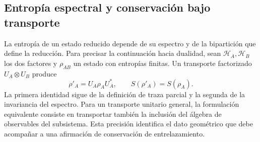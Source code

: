 \subsection{Entropía espectral y conservación bajo transporte}
\label{v:v:ant:sec:biparticion-transporte}

La entropía de un estado reducido depende de su espectro y de la
bipartición que define la reducción. Para precisar la continuación
hacia dualidad, sean \(\mathcal H_A,\mathcal H_B\) los dos factores
y \(\rho_{AB}\) un estado con entropías finitas. Un transporte
factorizado \(U_A\otimes U_B\) produce
\[
 \rho'_A=U_A\rho_AU_A^*,\qquad S(\rho'_A)=S(\rho_A).
\]
La primera identidad sigue de la definición de traza parcial y la
segunda de la invariancia del espectro. Para un transporte unitario
general, la formulación equivalente consiste en transportar también
la inclusión del álgebra de observables del subsistema. Esta precisión
identifica el dato geométrico que debe acompañar a una afirmación
de conservación de entrelazamiento.
